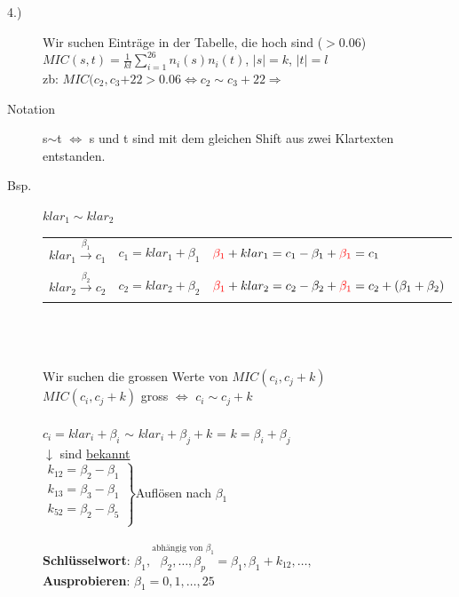 \documentclass[10pt]{article}
\newcommand{\T}[1]{\text{#1}} %
\newcommand{\Ra}{\Rightarrow}
\newcommand{\Abs}[1]{\left| #1 \right|} %
\newcommand{\Brackar}[2]{\left.\begin{array}{#1} #2 \end{array}\right\rbrace} %
\newcommand{\Sum}[2]{\sum_{#2}^{#1}} %
\newcommand{\Oneover}[1]{\frac{1}{#1}} %
\newcommand{\Oben}[2]{\overset{#1}{#2}} %
\begin{document}
\begin{description}
	\item[4.)] Wir suchen Einträge in der Tabelle, die hoch sind ($> 0.06$) \\
		$MIC(s,t)=\Oneover{kl}\Sum{26}{i=1}n_i(s)n_i(t)$, $\Abs{s}=k$, $\Abs{t}=l$\\
		zb: $MIC(c_2,c_3{+22} > 0.06 \Longleftrightarrow c_2 \sim c_3+22 \Ra$ \\
	\item[Notation] s$\sim$t $\Longleftrightarrow$ s und t sind mit dem gleichen Shift aus zwei Klartexten entstanden.
	\item[Bsp.] $klar_1 \sim klar_2$ \\
		\begin{tabular}{l | l | l}
			$klar_1 \xrightarrow[]{\beta_1} c_1$ & $c_1 = klar_1+\beta_1$ & ${\color{red}\beta_1}+klar_1=c_1-\beta_1+{\color{red}\beta_1}=c_1$ \\
			$klar_2 \xrightarrow[]{\beta_2} c_2$ & $c_2 = klar_2+\beta_2$ & ${\color{red}\beta_1}+klar_2=c_2-\beta_2+{\color{red}\beta_1}=c_2+(\beta_1+\beta_2)$\\
		\end{tabular} \\ \\ \\
		Wir suchen die grossen Werte von $MIC(c_i, c_j +k)$ \\
		$MIC(c_i, c_j +k)$ gross $\Longleftrightarrow$ $c_i \sim c_j + k$ \\ \\
		$c_i=klar_i+\beta_i$ $\sim$ $klar_i + \beta_j + k$ = {\color{red} $k = \beta_i + \beta_j$ }\\
		
		\hspace*{.2cm}$\downarrow$ sind \underline{bekannt}\\
		$\Brackar{c}{
		k_{12}=\beta_2-\beta_1\\
		k_{13}=\beta_3-\beta_1\\
		k_{52}=\beta_2-\beta_5\\
		}$Auflösen nach $\beta_1$\\\\
		\textbf{Schlüsselwort}: $\beta_1,\Oben{\T{abhängig von }\beta_1}{\beta_2,\dots,\beta_p}=\beta_1,\beta_1+k_{12},\dots,$ \\ 
		\textbf{Ausprobieren}: $\beta_1 = 0,1,\dots, 25$

\end{description}
\end{document}
